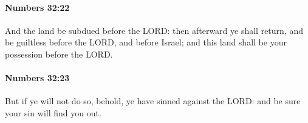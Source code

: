 		\paragraph{Numbers 32:22} %
			\label{NUMBERS-32-22}

			And the land be subdued before the LORD: then afterward ye shall return, and be guiltless before the LORD, and before Israel; and this land shall be your possession before the LORD.


		\paragraph{Numbers 32:23} %
			\label{NUMBERS-32-23}

			But if ye will not do so, behold, ye have sinned against the LORD: and be sure your sin will find you out.


